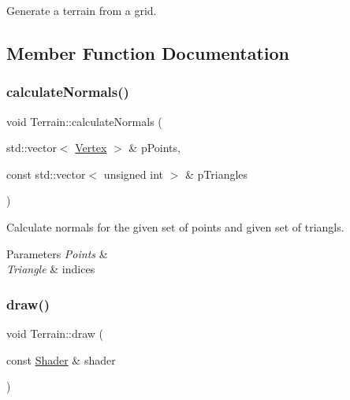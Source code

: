 Generate a terrain from a grid. 



\subsection{Member Function Documentation}
\mbox{\label{classTerrain_aa6063c2dfbed2fbba76800687288f24e}} 
\subsubsection{\texorpdfstring{calculate\+Normals()}{calculateNormals()}}
{\footnotesize\ttfamily void Terrain\+::calculate\+Normals (\begin{DoxyParamCaption}\item[{std\+::vector$<$ \hyperlink{structVertex}{Vertex} $>$ \&}]{p\+Points,  }\item[{const std\+::vector$<$ unsigned int $>$ \&}]{p\+Triangles }\end{DoxyParamCaption})\hspace{0.3cm}{\ttfamily [static]}}



Calculate normals for the given set of points and given set of triangls. 


\begin{DoxyParams}{Parameters}
{\em Points} & \\
\hline
{\em Triangle} & indices \\
\hline
\end{DoxyParams}
\mbox{\label{classTerrain_ac3a615c383f37e7fc9894d20cc090da2}} 
\subsubsection{\texorpdfstring{draw()}{draw()}}
{\footnotesize\ttfamily void Terrain\+::draw (\begin{DoxyParamCaption}\item[{const \hyperlink{classShader}{Shader} \&}]{shader }\end{DoxyParamCaption})\hspace{0.3cm}{\ttfamily [virtual]}}



